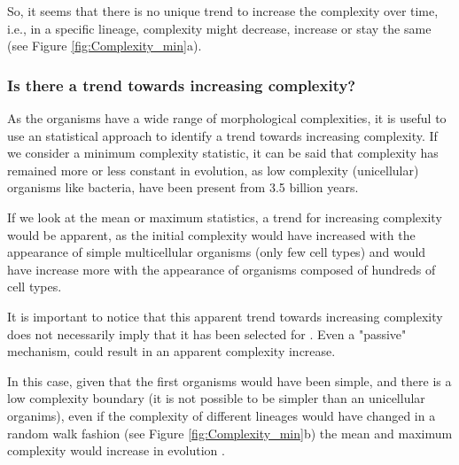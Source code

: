 So, it seems that there is no unique trend to increase the complexity over time, i.e., in a specific lineage, complexity might decrease, increase or stay the same (see Figure \ref{fig:Complexity_min}a).

\subsubsection{Is there a trend towards increasing complexity?}

As the organisms have a wide range of morphological complexities, it is useful to use an statistical approach to identify a trend towards increasing complexity.
If we consider a minimum complexity statistic, it can be said that complexity has remained more or less constant in evolution, as low complexity (unicellular) organisms like bacteria, have been present from 3.5 billion years.

If we look at the mean or maximum statistics, a trend for increasing complexity would be apparent, as the initial complexity would have increased with the appearance of simple multicellular organisms (only few cell types) and would have increase more with the appearance of organisms composed of hundreds of cell types.

It is important to notice that this apparent trend towards increasing complexity does not necessarily imply that it has been selected for \citep{McShea2015}.
Even a "passive" mechanism, 
could result in an apparent complexity increase.

In this case, given that the first organisms would have been simple, and there is a low complexity boundary (it is not possible to be simpler than an unicellular organims), even if the complexity of different lineages would have changed in a random walk fashion (see Figure \ref{fig:Complexity_min}b) the mean and maximum complexity would increase in evolution \citep{gould1996fullhouse}.




